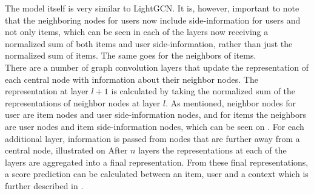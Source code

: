 The model itself is very similar to LightGCN.
It is, however, important to note that the neighboring nodes for users now include side-information for users and not only items, which can be seen in each of the layers now receiving a normalized sum of both items and user side-information, rather than just the normalized sum of items.
The same goes for the neighbors of items.
\\
There are a number of graph convolution layers that update the representation of each central node with information about their neighbor nodes.
The representation at layer $l+1$ is calculated by taking the normalized sum of the representations of neighbor nodes at layer $l$. 
As mentioned, neighbor nodes for user are item nodes and user side-information nodes, and for items the neighbors are user nodes and item side-information nodes, which can be seen on .
For each additional layer, information is passed from nodes that are further away from a central node, illustrated on 
After $n$ layers the representations at each of the layers are aggregated into a final representation.
From these final representations, a score prediction can be calculated between an item, user and a context which is further described in .




